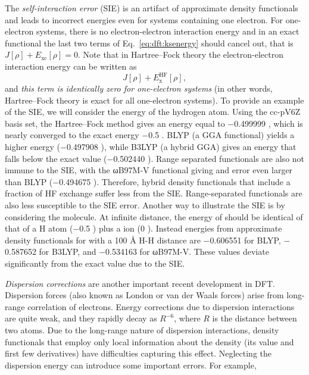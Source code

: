 \documentclass[../Main/notes.tex]{subfiles}
\begin{document}
The \emph{self-interaction error} (SIE) is an artifact of approximate density functionals and leads to incorrect energies even for systems containing one electron. 
For one-electron systems, there is no electron-electron interaction energy and in an exact functional the last two terms of Eq.~\eqref{eq:dft:ksenergy} should cancel out, that is $J[\rho] + E_\mathrm{xc}[\rho] = 0$.
Note that in Hartree--Fock theory the electron-electron interaction energy can be written as
\begin{equation}
J[\rho] + E_\mathrm{x}^\mathrm{HF}[\rho],
\end{equation}
and \emph{this term is identically zero for one-electron systems} (in other words, Hartree--Fock theory is exact for all one-electron systems).
To provide an example of the SIE, we will consider the energy of the hydrogen atom.
Using the cc-pV6Z basis set, the Hartree--Fock method gives an energy equal to $-$0.499999 \Eh, which is nearly converged to the exact energy $-$0.5 \Eh.
BLYP (a GGA functional) yields a higher energy ($-$0.497908 \Eh), while B3LYP (a hybrid GGA) gives an energy that falls below the exact value ($-$0.502440 \Eh).
Range separated functionals are also not immune to the SIE, with the ωB97M-V functional giving and error even larger than BLYP ($-$0.494675 \Eh).
Therefore, hybrid density functionals that include a fraction of HF exchange suffer less from the SIE.
Range-separated functionals are also less susceptible to the SIE error.
Another way to illustrate the SIE is by considering the  molecule.
At infinite distance, the energy of  should be identical of that of a H atom ($-$0.5 \Eh) plus a  ion (0 \Eh).
Instead energies from approximate density functionals for  with a 100 \AA{} H-H distance are $-$0.606551 \Eh for BLYP, $-$0.587652 \Eh for B3LYP, and $-$0.534163 \Eh for ωB97M-V.
These values deviate significantly from the exact value due to the SIE.

\emph{Dispersion corrections} are another important recent development in DFT.
Dispersion forces (also known as London or van der Waals forces) arise from long-range correlation of electrons.
Energy corrections due to dispersion interactions are quite weak, and they rapidly decay as $R^{-6}$, where $R$ is the distance between two atoms.
Due to the long-range nature of dispersion interactions, density functionals that employ only local information about the density (its value and first few derivatives) have difficulties capturing this effect.
Neglecting the dispersion energy can introduce some important errors.
For example, 
\end{document}
